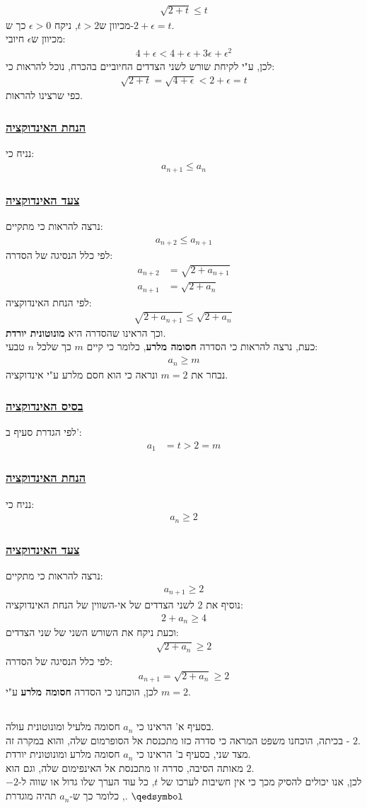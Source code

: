 \documentclass[a4paper, 12pt, leqno]{article}
\newcommand{\sub}[1]{\subsection{\underline{#1}}}
\newcommand{\subsub}[1]{\subsubsection{\underline{#1}}}
\newcommand{\eq}[1]{\begin{align*}#1\end{align*}}
\renewcommand{\qed}{\hfill\(\qedsymbol\)}
\renewcommand{\leq}{\leqslant}
\renewcommand{\geq}{\geqslant}
\begin{document}
\eq{
    \sqrt{2+t}\leq{t}
}
מכיוון ש$t>2$, ניקח $\epsilon>0$ כך ש-$2+\epsilon=t$.\\
מכיוון ש$\epsilon$ חיובי:
\eq{
    4+\epsilon<4+\epsilon+3\epsilon+\epsilon^2
}
לכן, ע"י לקיחת שורש לשני הצדדים החיוביים בהכרח, נוכל להראות כי:
\eq{
    \sqrt{2+t}=\sqrt{4+\epsilon}<2+\epsilon=t
}
כפי שרצינו להראות.
\subsub{הנחת האינדוקציה}
נניח כי:
\eq{
    a_{n+1}\leq{a_n}
}
\subsub{צעד האינדוקציה}
נרצה להראות כי מתקיים:
\eq{
    a_{n+2}\leq{a_{n+1}}
}
לפי כלל הנסיגה של הסדרה:
\eq{
    a_{n+2}&=\sqrt{2+a_{n+1}}\\
    a_{n+1}&=\sqrt{2+a_n}
}
לפי הנחת האינדוקציה:
\eq{
    \sqrt{2+a_{n+1}}\leq\sqrt{2+a_n}
}
וכך הראינו שהסדרה היא \textbf{מונוטונית יורדת}.
\pagebreak\\
כעת, נרצה להראות כי הסדרה \textbf{חסומה מלרע}, כלומר כי קיים $m$ כך שלכל $n$ טבעי:
\eq{
    a_n\geq{m}
}
נבחר את $m=2$ ונראה כי הוא חסם מלרע ע"י אינדוקציה.
\subsub{בסיס האינדוקציה}
לפי הגדרת סעיף ב':
\eq{
    a_1&=t>2=m
}
\subsub{הנחת האינדוקציה}
נניח כי:
\eq{
    a_{n}\geq2
}
\subsub{צעד האינדוקציה}
נרצה להראות כי מתקיים:
\eq{
    a_{n+1}\geq2
}
נוסיף את 2 לשני הצדדים של אי-השווין של הנחת האינדוקציה:
\eq{
    2+a_{n}\geq4
}
וכעת ניקח את השורש השני של שני הצדדים:
\eq{
    \sqrt{2+a_n}\geq2
}
לפי כלל הנסיגה של הסדרה:
\eq{
    a_{n+1}=\sqrt{2+a_n}\geq2
}
לכן, הוכחנו כי הסדרה \textbf{חסומה מלרע} ע"י $m=2$.
\sub{}
בסעיף א' הראינו כי $a_n$ חסומה מלעיל ומונוטונית עולה.\\
בכיתה, הוכחנו משפט המראה כי סדרה כזו מתכנסת אל הסופרמום שלה, והוא במקרה זה - $2$.\\
מצד שני, בסעיף ב' הראינו כי $a_n$ חסומה מלרע ומונוטונית יורדת.\\
מאותה הסיבה, סדרה זו מתכנסת אל האינפימום שלה, וגם הוא $2$.\\
לכן, אנו יכולים להסיק מכך כי אין חשיבות לערכו של $t$, כל עוד הערך שלו גדול או שווה ל-$-2$, כלומר כך ש-$a_n$ תהיה מוגדרת.
\qed


\end{document}
